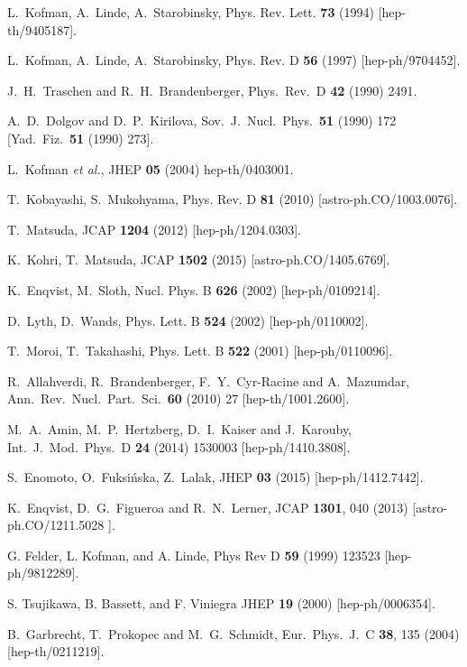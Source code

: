 \documentclass[twocolumn,showpacs,preprintnumbers,amsmath,amssymb,nofootinbib,superscriptaddress,prc]{revtex4}
\begin{document}
\begin{thebibliography}{99}

      L.~Kofman, A.~Linde, A.~Starobinsky,
      Phys. Rev. Lett. \textbf{73} (1994)
      \mbox{[hep-th/9405187]}.
      
      L.~Kofman, A.~Linde, A.~Starobinsky,
      Phys. Rev. D \textbf{56} (1997)
      \mbox{[hep-ph/9704452]}.
      
  J.~H.~Traschen and R.~H.~Brandenberger,
  Phys.\ Rev.\ D {\bf 42} (1990) 2491.
  
  A.~D.~Dolgov and D.~P.~Kirilova,
  Sov.\ J.\ Nucl.\ Phys.\  {\bf 51} (1990) 172
   [Yad.\ Fiz.\  {\bf 51} (1990) 273].
      
      L.~Kofman \textit{et al.},
      JHEP \textbf{05} (2004)
      \mbox{hep-th/0403001}.

      T.~Kobayashi, S.~Mukohyama, 
      Phys. Rev. D \textbf{81} (2010)
      \mbox{[astro-ph.CO/1003.0076]}.
      
      T.~Matsuda, 
      JCAP \textbf{1204} (2012)
      [hep-ph/1204.0303].      

      K.~Kohri, T.~Matsuda, 
      JCAP \textbf{1502} (2015)
      \mbox{[astro-ph.CO/1405.6769]}. 
     
      K.~Enqvist, M.~Sloth, 
      Nucl. Phys. B \textbf{626} (2002)
      \mbox{[hep-ph/0109214]}.

      D.~Lyth, D.~Wands, 
      Phys. Lett. B \textbf{524} (2002)
      \mbox{[hep-ph/0110002]}.

      T.~Moroi, T.~Takahashi, 
      Phys. Lett. B \textbf{522} (2001)
      \mbox{[hep-ph/0110096]}. 
      
  	  R.~Allahverdi, R.~Brandenberger, F.~Y.~Cyr-Racine and A.~Mazumdar,
      Ann.\ Rev.\ Nucl.\ Part.\ Sci.\  {\bf 60} (2010) 27
      [hep-th/1001.2600].
      
	  M.~A.~Amin, M.~P.~Hertzberg, D.~I.~Kaiser and J.~Karouby,
  	  Int.\ J.\ Mod.\ Phys.\ D {\bf 24} (2014) 1530003
  	  [hep-ph/1410.3808].
 
      S.~Enomoto, O.~Fuksi{\'n}ska, Z.~Lalak, 
      JHEP \textbf{03} (2015)
      [hep-ph/1412.7442].
       

  K.~Enqvist, D.~G.~Figueroa and R.~N.~Lerner,
  JCAP {\bf 1301}, 040 (2013)
  [astro-ph.CO/1211.5028 ].
      
	G. Felder, L. Kofman, and A. Linde,
	Phys Rev D {\bf 59} (1999) 123523
	[hep-ph/9812289].

	S. Tsujikawa, B. Bassett, and F. Viniegra 
	JHEP {\bf 19} (2000)
	[hep-ph/0006354].


  B.~Garbrecht, T.~Prokopec and M.~G.~Schmidt,
  Eur.\ Phys.\ J.\ C {\bf 38}, 135 (2004)
  [hep-th/0211219].
\end{thebibliography}
\end{document}
